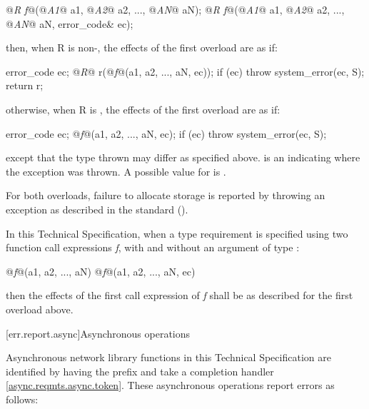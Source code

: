 \begin{codeblock}
@\textit{R f}@(@\textit{A1}@ a1, @\textit{A2}@ a2, ..., @\textit{AN}@ aN);
@\textit{R f}@(@\textit{A1}@ a1, @\textit{A2}@ a2, ..., @\textit{AN}@ aN, error_code& ec);
\end{codeblock}

\pnum
then, when R is non-, the effects of the first overload are as if:

\begin{codeblock}
error_code ec;
@\textit{R}@ r(@\textit{f}@(a1, a2, ..., aN, ec));
if (ec) throw system_error(ec, S);
return r;
\end{codeblock}

\pnum
otherwise, when R is , the effects of the first overload are as if:

\begin{codeblock}
error_code ec;
@\textit{f}@(a1, a2, ..., aN, ec);
if (ec) throw system_error(ec, S);
\end{codeblock}

\pnum
except that the type thrown may differ as specified above.  is an \ntbs indicating where the exception was thrown. \enternote A possible value for  is . \exitnote

\pnum
 For both overloads, failure to allocate storage is reported by throwing an exception as described in the \Cpp standard ().

\pnum
In this Technical Specification, when a type requirement is specified using two function call expressions \textit{f}, with and without an argument  of type :

\begin{codeblock}
@\textit{f}@(a1, a2, ..., aN)
@\textit{f}@(a1, a2, ..., aN, ec)
\end{codeblock}

\pnum
then the effects of the first call expression of \textit{f} shall be as described for the first overload above.



[err.report.async]{Asynchronous operations}

\pnum
Asynchronous network library functions in this Technical Specification are identified by having the prefix  and take a completion handler \ref{async.reqmts.async.token}. These asynchronous operations report errors as follows:

